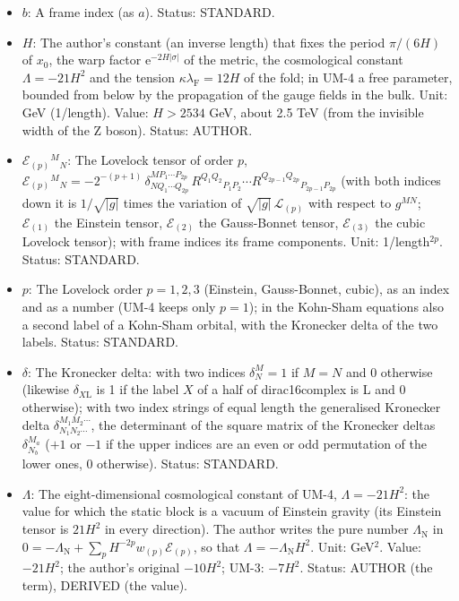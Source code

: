 \documentclass[
  10pt,
]{article}
\begin{document}
\begin{itemize}
  \(\hat g_{ab}\) and the tensors built from it) a coordinate index of
  the fold, \(a \in \{1, \dots, 7\}\); a repeated index is summed.
  Status: STANDARD.
\item
  \(b\): A frame index (as \(a\)). Status: STANDARD.
\item
  \(H\): The author's constant (an inverse length) that fixes the period
  \(\pi/(6H)\) of \(x_0\), the warp factor
  \(\mathrm{e}^{-2H\lvert\sigma\rvert}\) of the metric, the cosmological
  constant \(\Lambda = -21H^2\) and the tension
  \(\kappa\lambda_{\mathrm{F}} = 12H\) of the fold; in UM-4 a free
  parameter, bounded from below by the propagation of the gauge fields
  in the bulk. Unit: GeV (1/length). Value: \(H > 2534\) GeV, about 2.5
  TeV (from the invisible width of the Z boson). Status: AUTHOR.
\item
  \(\mathcal{E}_{(p)}{}^M{}_N\): The Lovelock tensor of order \(p\),
  \(\mathcal{E}_{(p)}{}^M{}_N = -2^{-(p+1)}\,\delta^{MP_1\cdots P_{2p}}_{NQ_1\cdots Q_{2p}}\,R^{Q_1Q_2}{}_{P_1P_2}\cdots R^{Q_{2p-1}Q_{2p}}{}_{P_{2p-1}P_{2p}}\)
  (with both indices down it is \(1/\sqrt{\lvert g\rvert}\) times the
  variation of \(\sqrt{\lvert g\rvert}\,\mathcal{L}_{(p)}\) with respect
  to \(g^{MN}\); \(\mathcal{E}_{(1)}\) the Einstein tensor,
  \(\mathcal{E}_{(2)}\) the Gauss-Bonnet tensor, \(\mathcal{E}_{(3)}\)
  the cubic Lovelock tensor); with frame indices its frame components.
  Unit: 1/length\(^{2p}\). Status: STANDARD.
\item
  \(p\): The Lovelock order \(p = 1, 2, 3\) (Einstein, Gauss-Bonnet,
  cubic), as an index and as a number (UM-4 keeps only \(p = 1\)); in
  the Kohn-Sham equations also a second label of a Kohn-Sham orbital,
  with the Kronecker delta of the two labels. Status: STANDARD.
\item
  \(\delta\): The Kronecker delta: with two indices \(\delta^M_N = 1\)
  if \(M = N\) and 0 otherwise (likewise \(\delta_{X\mathrm{L}}\) is 1
  if the label \(X\) of a half of dirac16complex is L and 0 otherwise);
  with two index strings of equal length the generalised Kronecker delta
  \(\delta^{M_1M_2\cdots}_{N_1N_2\cdots}\), the determinant of the
  square matrix of the Kronecker deltas \(\delta^{M_a}_{N_b}\) (\(+1\)
  or \(-1\) if the upper indices are an even or odd permutation of the
  lower ones, 0 otherwise). Status: STANDARD.
\item
  \(\Lambda\): The eight-dimensional cosmological constant of UM-4,
  \(\Lambda = -21H^2\): the value for which the static block is a vacuum
  of Einstein gravity (its Einstein tensor is \(21H^2\) in every
  direction). The author writes the pure number \(\Lambda_{\mathrm{N}}\)
  in
  \(0 = -\Lambda_{\mathrm{N}} + \sum_p H^{-2p}w_{(p)}\mathcal{E}_{(p)}\),
  so that \(\Lambda = -\Lambda_{\mathrm{N}}H^2\). Unit: GeV\(^2\).
  Value: \(-21H^2\); the author's original \(-10H^2\); UM-3: \(-7H^2\).
  Status: AUTHOR (the term), DERIVED (the value).
\end{itemize}
\end{document}
